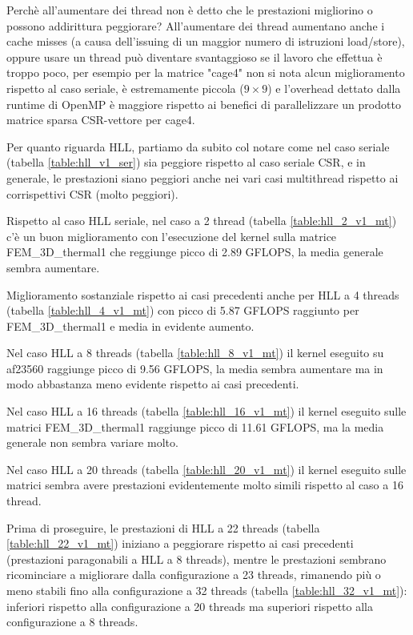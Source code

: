 \documentclass[a4paper,9pt]{extarticle}
\begin{document}
Perchè all'aumentare dei thread non è detto che le prestazioni migliorino o possono addirittura
peggiorare? All'aumentare dei thread aumentano anche i cache misses (a causa dell'issuing di un
 maggior numero di istruzioni load/store), oppure usare un thread può
diventare svantaggioso se il lavoro che effettua è troppo poco, per esempio per la matrice
"cage4" non si nota alcun miglioramento rispetto al caso seriale, è estremamente piccola ($9\times9$) 
e l'overhead dettato dalla runtime di OpenMP è maggiore rispetto ai benefici di parallelizzare
un prodotto matrice sparsa CSR-vettore per cage4.

Per quanto riguarda HLL, partiamo da subito col notare come nel caso seriale (tabella 
\ref{table:hll_v1_ser}) sia peggiore rispetto al caso seriale CSR, e in generale, le prestazioni
siano peggiori anche nei vari casi multithread rispetto ai corrispettivi CSR (molto peggiori).

Rispetto al caso HLL seriale, nel caso a 2 thread (tabella \ref{table:hll_2_v1_mt}) c'è un buon 
miglioramento con l'esecuzione del kernel sulla matrice FEM\_3D\_thermal1 che reggiunge picco di 2.89 GFLOPS,
la media generale sembra aumentare.

Miglioramento sostanziale rispetto ai casi precedenti anche per HLL a 4 threads (tabella 
\ref{table:hll_4_v1_mt}) con picco di 5.87 GFLOPS raggiunto per FEM\_3D\_thermal1 e media in
evidente aumento.

Nel caso HLL a 8 threads (tabella \ref{table:hll_8_v1_mt}) il kernel eseguito su af23560
raggiunge picco di 9.56 GFLOPS, la media sembra aumentare ma in modo abbastanza meno evidente
rispetto ai casi precedenti.

Nel caso HLL a 16 threads (tabella \ref{table:hll_16_v1_mt}) il kernel eseguito sulle matrici
FEM\_3D\_thermal1 raggiunge picco di 11.61 GFLOPS, ma la media generale non sembra variare molto.

Nel caso HLL a 20 threads (tabella \ref{table:hll_20_v1_mt}) il kernel eseguito sulle matrici
sembra avere prestazioni evidentemente molto simili rispetto al caso a 16 thread.

Prima di proseguire, le prestazioni di HLL a 22 threads (tabella \ref{table:hll_22_v1_mt}) 
iniziano a peggiorare rispetto ai casi precedenti (prestazioni paragonabili a HLL a 8 threads),
mentre le prestazioni sembrano ricominciare a migliorare dalla configurazione a 23 threads, 
rimanendo più o meno stabili fino alla configurazione a 32 threads (tabella 
\ref{table:hll_32_v1_mt}): inferiori rispetto alla configurazione a 20 threads ma superiori 
rispetto alla configurazione a 8 threads.
\end{document}
